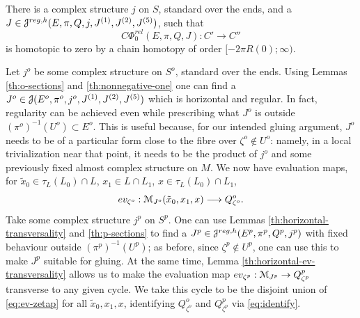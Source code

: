 \documentclass[10pt,letterpaper]{article}
\begin{document}
%
\begin{lemma} \label{th:order-homotopy}
There is a complex structure $j$ on $S$, standard over the ends, and a $J \in
\mathcal{J}^{reg,h}(E,\pi,Q,j,J^{(1)},J^{(2)},J^{(5)})$, such that
\[
C\Phi_0^{rel}(E,\pi,Q,J): C' \longrightarrow C''
\]
is homotopic to zero by a chain homotopy of order $[-2\pi R(0);\infty)$.
\end{lemma}

\proof Let $j^o$ be some complex structure on $S^o$, standard over the ends.
Using Lemmas \ref{th:o-sections} and \ref{th:nonnegative-one} one can find a
$J^o \in \mathcal{J}(E^o,\pi^o,j^o,J^{(1)},J^{(2)},J^{(5)})$ which is horizontal and
regular. In fact, regularity can be achieved even while prescribing what $J^o$
is outside $(\pi^o)^{-1}(U^o) \subset E^o$. This is useful because, for our
intended gluing argument, $J^o$ needs to be of a particular form close to the
fibre over $\zeta^o \notin U^o$: namely, in a local trivialization near that
point, it needs to be the product of $j^o$ and some previously fixed almost
complex structure on $M$. We now have evaluation maps, for $\tilde{x}_0 \in
\tau_L(L_0) \cap L$, $x_1 \in L \cap L_1$, $x \in \tau_L(L_0) \cap L_1$,
\begin{equation} \label{eq:ev-zetap}
ev_{\zeta^o}: \mathcal{M}_{J^o}(\tilde{x}_0,x_1,x) \longrightarrow Q^o_{\zeta^o}.
\end{equation}
Take some complex structure $j^p$ on $S^p$. One can use Lemmas
\ref{th:horizontal-transversality} and \ref{th:p-sections} to find a $J^p \in
\mathcal{J}^{reg,h}(E^p,\pi^p,Q^p,j^p)$ with fixed behaviour outside
$(\pi^p)^{-1}(U^p)$; as before, since $\zeta^p \notin U^p$, one can use this to
make $J^p$ suitable for gluing. At the same time, Lemma
\ref{th:horizontal-ev-transversality} allows us to make the evaluation map
$ev_{\zeta^p}: \mathcal{M}_{J^p} \rightarrow Q^p_{\zeta^p}$ transverse to any given
cycle. We take this cycle to be the disjoint union of \eqref{eq:ev-zetap} for
all $\tilde{x}_0,x_1,x$, identifying $Q^o_{\zeta^o}$ and $Q^p_{\zeta^p}$ via
\eqref{eq:identify}.
\end{document}
